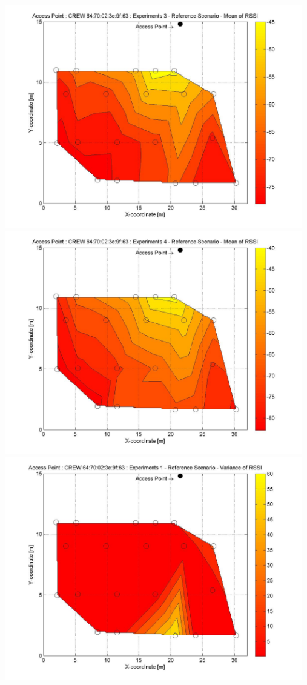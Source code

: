 \documentclass[11pt,a4paper,headinclude,footinclude,chapterprefix=on]{scrreprt}
\begin{document}
\begin{longtable}
	\includegraphics[width=13cm]{../../Source/plot/CREW_63/63_Ref_Ex_3_Mean.jpg} \\
	\includegraphics[width=13cm]{../../Source/plot/CREW_63/63_Ref_Ex_4_Mean.jpg} \\
	\includegraphics[width=13cm]{../../Source/plot/CREW_63/63_Ref_Ex_1_Variance.jpg} \\

\end{longtable}
\end{document}
